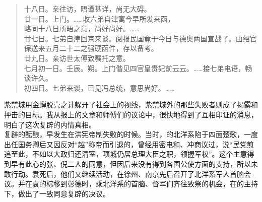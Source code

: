 \begin{quote}
十八日。亲往访，晤谭甚详，尚无大碍。\\

廿一日。上门。……收六弟自津寓今早所发来函，\\

略同十八日所晤之意，尚好尚好。……\\

廿七日。七弟自津回京来谈。阅报民国竟于今日与德奥两国宣战了。由绍官保送来五月二十二之强硬函件，存以备考。\\

廿九日。亲访世太傅致嘱托之意。\\

七月初一日。壬辰。朔。上门偕见四官皇贵妃前云云。……接七弟电语，畅谈许久。\\

初四日。七弟来谈，已见冯总统，意思尚好。……\\
\end{quote}

紫禁城用金蝉脱壳之计躲开了社会上的视线，紫禁城外的那些失败者则成了揭露和抨击的目标。我从报上的文章和师傅们的议论中，很快地得到了互相印证的消息，明白了这次复辟的内情真相。\\

复辟的酝酿，早发生在洪宪帝制失败的时候。当时，的北洋系陷于四面楚歌，一度出任国务卿后又因反对“越”称帝而引退的，曾经用密电和、冲商议过，说“民党煎追至此，不如以大政归还清室，项城仍居总理大臣之职，领握军权”。这个主意得到早有此心的张、倪二人的同意，但因后来没有得到各国公使方面的支持，所以未敢行动。袁死后，他们又继续活动，在徐州、南京先后召开了北洋系军人首脑会议。并在袁的棕移到彰德时，乘北洋系的首脑、督军们齐往致祭的机会，在的主持下，做出了一致同意复辟的决议。\\


